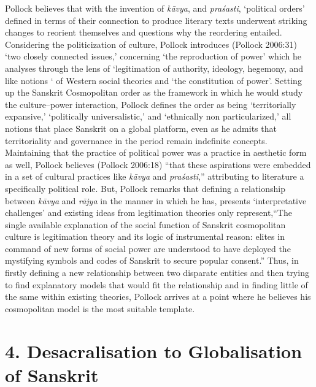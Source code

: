 Pollock believes that with the invention of \textit{kāvya}, and \textit{praśasti}, ‘political orders’ defined in terms of their connection to produce literary texts underwent striking changes to reorient themselves and questions why the reordering entailed. Considering the politicization of culture, Pollock introduces (Pollock 2006:31) ‘two closely connected issues,’ concerning ‘the reproduction of power’ which he analyses through the lens of ‘legitimation of authority, ideology, hegemony, and like notions ‘ of Western social theories and ‘the constitution of power’. Setting up the Sanskrit Cosmopolitan order as the framework in which he would study the culture–power interaction, Pollock defines the order as being ‘territorially expansive,’ ‘politically universalistic,’ and ‘ethnically non particularized,’ all notions that place Sanskrit on a global platform, even as he admits that territoriality and governance in the period remain indefinite concepts. Maintaining that the practice of political power was a practice in aesthetic form as well, Pollock believes (Pollock 2006:18) “that these aspirations were embedded in a set of cultural practices like \textit{kāvya} and \textit{praśasti},” attributing to literature a specifically political role. But, Pollock remarks that defining a relationship between \textit{kāvya} and \textit{rājya} in the manner in which he has, presents ‘interpretative challenges’ and existing ideas from legitimation theories only represent,“The single available explanation of the social function of Sanskrit cosmopolitan culture is legitimation theory and its logic of instrumental reason: elites in command of new forms of social power are understood to have deployed the mystifying symbols and codes of Sanskrit to secure popular consent.” Thus, in firstly defining a new relationship between two disparate entities and then trying to find explanatory models that would fit the relationship and in finding little of the same within existing theories, Pollock arrives at a point where he believes his cosmopolitan model is the most suitable template.


\section*{4. Desacralisation to Globalisation of Sanskrit}

